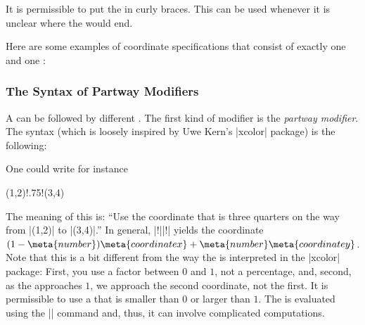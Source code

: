 It is permissible to put the  in curly braces. This can
be used whenever it is unclear where the  would end.

Here are some examples of coordinate specifications that consist of
exactly one  and one :
\begin{codeexample}[]
\end{codeexample}



\subsubsection{The Syntax of Partway Modifiers}

A  can be followed by different . The
first kind of modifier is the \emph{partway modifier}. The syntax
(which is loosely inspired by Uwe Kern's |xcolor| package) is the
following:
\begin{quote}
\end{quote}
One could write for instance
\begin{codeexample}
(1,2)!.75!(3,4)
\end{codeexample}
The meaning of this is: ``Use the coordinate that is three quarters on
the way from |(1,2)| to |(3,4)|.'' In general, |!||!| yields the coordinate
$(1-\meta{number})\meta{coordinate x} + \meta{number} \meta{coordinate
  y}$. Note that this is a bit different from the way the
 is interpreted in the |xcolor| package: First, you use a
factor between $0$ and $1$, not a percentage, and, second, as the
 approaches $1$, we approach the second coordinate, not
the first. It is permissible to use a  that is smaller
than $0$ or larger than $1$. The  is evaluated using the
|\pgfmathparse| command and, thus, it can involve complicated
computations.

\begin{codeexample}[]
\end{codeexample}

